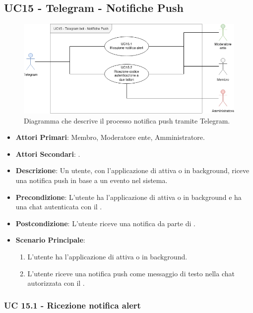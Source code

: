 \subsection{UC15 - Telegram - Notifiche Push}
		
	\begin{figure}[H]
		\centering
		\includegraphics[scale=0.60]{res/images/uc15}
		\caption{Diagramma che descrive il processo notifica push tramite Telegram.}
	\end{figure}
		
	\begin{itemize}
		\item \textbf{Attori Primari}: Membro, Moderatore ente, Amministratore.
		\item \textbf{Attori Secondari}: .
		\item \textbf{Descrizione}: Un utente, con l'applicazione di  attiva o in background, riceve una notifica push in base a un evento nel sistema. 
		\item \textbf{Precondizione}: L'utente ha l'applicazione di  attiva o in background e ha una chat autenticata con il .
		\item \textbf{Postcondizione}: L'utente riceve una notifica da parte di .
		\item \textbf{Scenario Principale}:
		\begin{enumerate}
			\item L'utente ha l'applicazione di  attiva o in background. 
			\item L'utente riceve una notifica push come messaggio di testo nella chat autorizzata con il .
		\end{enumerate}
	\end{itemize}
	
	\subsubsection{UC 15.1 - Ricezione notifica alert}

